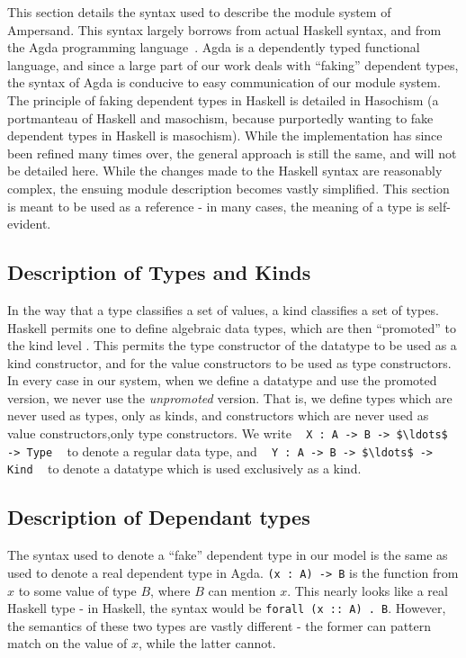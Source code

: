 This section details the syntax used to describe the module system of
Ampersand. This syntax largely borrows from actual Haskell syntax, and from the
Agda programming language~\cite{agda}.
Agda is a dependently typed functional
language, and since a large part of our work deals with ``faking'' dependent
types, the syntax of Agda is conducive to easy communication of our module 
system. The
principle of faking dependent types in Haskell is detailed in
Hasochism \citep{hasochism} 
(a portmanteau of Haskell and masochism, because
purportedly wanting to fake dependent types in Haskell is masochism). While the
implementation has since been refined many times over, the general approach is 
still the
same, and will not be detailed here.
While the changes made to the Haskell syntax are reasonably complex, the 
ensuing 
module description becomes vastly simplified. This section is meant to be used
as a reference - in many cases, the meaning of a type is self-evident. 

\noindent
\subsection*{Description of Types and Kinds}

In the way that a type classifies a set of values, a kind classifies a set of
types. Haskell permits one to define algebraic data types, which are then 
``promoted''
to the kind level \citep{promotion}. 
This permits the type constructor of the datatype to be used
as a kind constructor, and for the value constructors to be used as type 
constructors. In every case in our system, when we define a datatype and use 
the promoted version, we never use the \emph{unpromoted} version. That is, we 
define types which are never used as types, only as kinds, and constructors 
which are never used as value constructors,only type constructors. We write 
\,\,\,
\lstinline!X : A -> B -> $\ldots$ -> Type!
\,\,\, 
to denote a regular data type, and 
\,\,\,
\lstinline!Y : A -> B -> $\ldots$ -> Kind!
\,\,\, 
to denote a datatype
which is used exclusively as a kind. 

\noindent
\subsection*{Description of Dependant types}

The syntax used to denote a ``fake'' dependent type in our model is the same 
as used to denote a real dependent type in Agda. \lstinline!(x : A) -> B! is 
the function
from $x$ to some value of type $B$, where $B$ can mention $x$. This nearly 
looks like a 
real Haskell type - in Haskell, the syntax would be \texttt{forall (x :: A) . 
B}. However, 
the semantics of these two types are vastly different - the former can pattern 
match
on the value of $x$, while the latter cannot. 

